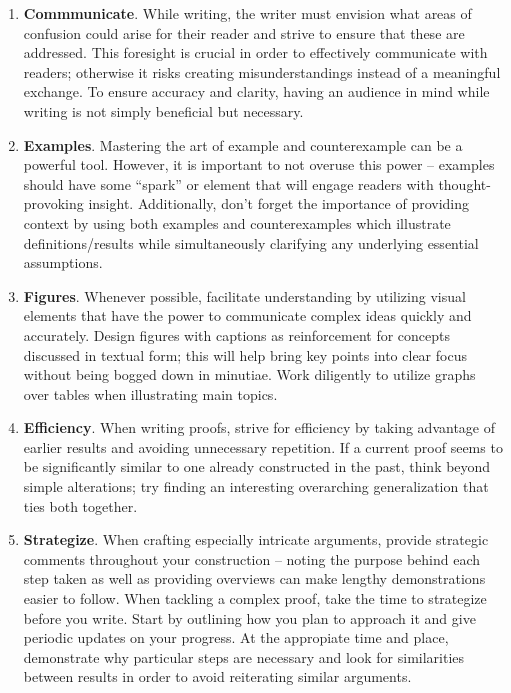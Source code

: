\documentclass[
  twoside,
  12pt,
  letterpaper,
  fleqn]{article}
\begin{document}
\begin{enumerate}
\def\labelenumi{\arabic{enumi}.}
\item
  \textbf{Commmunicate}. While writing, the writer must envision what
  areas of confusion could arise for their reader and strive to ensure
  that these are addressed. This foresight is crucial in order to
  effectively communicate with readers; otherwise it risks creating
  misunderstandings instead of a meaningful exchange. To ensure accuracy
  and clarity, having an audience in mind while writing is not simply
  beneficial but necessary.
\item
  \textbf{Examples}. Mastering the art of example and counterexample can
  be a powerful tool. However, it is important to not overuse this power
  -- examples should have some ``spark'' or element that will engage
  readers with thought-provoking insight. Additionally, don't forget the
  importance of providing context by using both examples and
  counterexamples which illustrate definitions/results while
  simultaneously clarifying any underlying essential assumptions.
\item
  \textbf{Figures}. Whenever possible, facilitate understanding by
  utilizing visual elements that have the power to communicate complex
  ideas quickly and accurately. Design figures with captions as
  reinforcement for concepts discussed in textual form; this will help
  bring key points into clear focus without being bogged down in
  minutiae. Work diligently to utilize graphs over tables when
  illustrating main topics.
\item
  \textbf{Efficiency}. When writing proofs, strive for efficiency by
  taking advantage of earlier results and avoiding unnecessary
  repetition. If a current proof seems to be significantly similar to
  one already constructed in the past, think beyond simple alterations;
  try finding an interesting overarching generalization that ties both
  together.
\item
  \textbf{Strategize}. When crafting especially intricate arguments,
  provide strategic comments throughout your construction -- noting the
  purpose behind each step taken as well as providing overviews can make
  lengthy demonstrations easier to follow. When tackling a complex
  proof, take the time to strategize before you write. Start by
  outlining how you plan to approach it and give periodic updates on
  your progress. At the appropiate time and place, demonstrate why
  particular steps are necessary and look for similarities between
  results in order to avoid reiterating similar arguments.
\end{enumerate}
\end{document}
